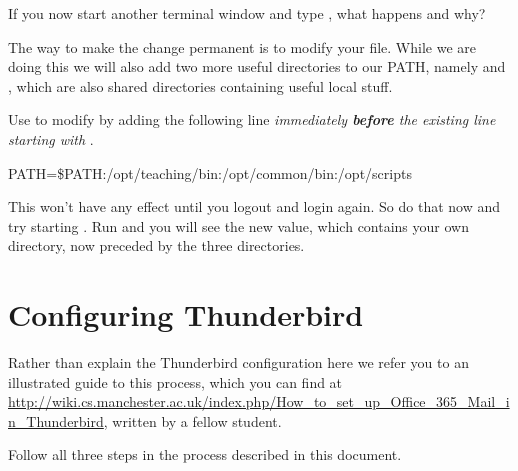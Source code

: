 If you now start another terminal window and type , what happens and why?

The way to make the change permanent is to modify your
 file. While we are doing this we will also add two more 
useful directories to our PATH, namely  and ,
which are also shared directories containing useful local stuff.

Use  to modify   by adding the following line \emph{immediately \textbf{before} the existing line starting with }.

\begin{ttoutenv}
PATH=\$PATH:/opt/teaching/bin:/opt/common/bin:/opt/scripts
\end{ttoutenv}


This won't have any effect until you logout and login again. So do that now and try starting . Run  and you will see the new value, which contains  your own  directory, now preceded by the three  directories.


\section{Configuring Thunderbird}


Rather than explain the Thunderbird configuration here we refer you to an illustrated guide to this process, which you can find at \url{http://wiki.cs.manchester.ac.uk/index.php/How_to_set_up_Office_365_Mail_in_Thunderbird}, written by a fellow student.

Follow all three steps in the process described in this document.


